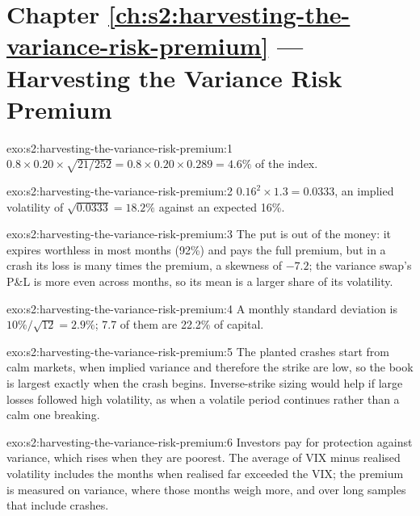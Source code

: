 \section*{Chapter \ref{ch:s2:harvesting-the-variance-risk-premium} --- Harvesting the Variance Risk Premium}

\begin{solution}{exo:s2:harvesting-the-variance-risk-premium:1}
$0.8 \times 0.20 \times \sqrt{21/252} = 0.8 \times 0.20 \times 0.289 = 4.6\%$ of the index.
\end{solution}

\begin{solution}{exo:s2:harvesting-the-variance-risk-premium:2}
$0.16^2 \times 1.3 = 0.0333$, an implied volatility of $\sqrt{0.0333} = 18.2\%$ against an expected 16\%.
\end{solution}

\begin{solution}{exo:s2:harvesting-the-variance-risk-premium:3}
The put is out of the money: it expires worthless in most months (92\%) and pays the full premium, but in a crash its loss is many times the premium, a
skewness of $-7.2$; the variance swap's P\&L is more even across months, so its mean is a larger share of its volatility.
\end{solution}

\begin{solution}{exo:s2:harvesting-the-variance-risk-premium:4}
A monthly standard deviation is $10\%/\sqrt{12} = 2.9\%$; 7.7 of them are 22.2\% of capital.
\end{solution}

\begin{solution}{exo:s2:harvesting-the-variance-risk-premium:5}
The planted crashes start from calm markets, when implied variance and therefore the strike are low, so the book is largest exactly when the crash
begins. Inverse-strike sizing would help if large losses followed high volatility, as when a volatile period continues rather than a calm one
breaking.
\end{solution}

\begin{solution}{exo:s2:harvesting-the-variance-risk-premium:6}
Investors pay for protection against variance, which rises when they are poorest. The average of VIX minus realised volatility includes the months when
realised far exceeded the VIX; the premium is measured on variance, where those months weigh more, and over long samples that include crashes.
\end{solution}

